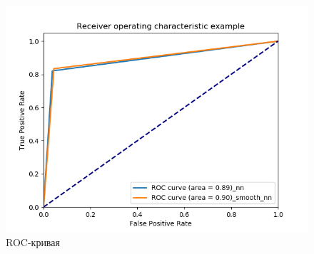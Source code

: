 \documentclass[../body.tex]{subfiles}
\begin{document}
\begin{figure}[H]
	\centering
	\includegraphics[scale=0.7]{images/roc_curve.png}
	\caption{ROC-кривая}\label{ROC_plot}
\end{figure}
\end{document}
